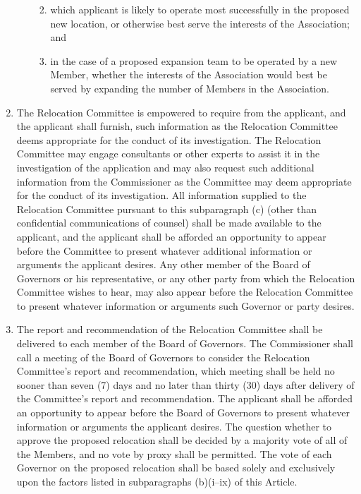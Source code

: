 \documentclass[]{book}
\providecommand{\tightlist}{%
  \setlength{\itemsep}{0pt}\setlength{\parskip}{0pt}}
\begin{document}
\begin{enumerate}
\begin{enumerate}
    \begin{enumerate}
    \def\labelenumiii{(\roman{enumiii})}
    \tightlist
    \item
      which applicant is likely to operate most successfully in the proposed new location, or otherwise best serve the interests of the Association; and
    \item
      in the case of a proposed expansion team to be operated by a new Member, whether the interests of the Association would best be served by expanding the number of Members in the Association.
    \end{enumerate}
  \end{enumerate}
\item
  The Relocation Committee is empowered to require from the applicant, and the applicant shall furnish, such information as the Relocation Committee deems appropriate for the conduct of its investigation. The Relocation Committee may engage consultants or other experts to assist it in the investigation of the application and may also request such additional information from the Commissioner as the Committee may deem appropriate for the conduct of its investigation. All information supplied to the Relocation Committee pursuant to this subparagraph (c) (other than confidential communications of counsel) shall be made available to the applicant, and the applicant shall be afforded an opportunity to appear before the Committee to present whatever additional information or arguments the applicant desires. Any other member of the Board of Governors or his representative, or any other party from which the Relocation Committee wishes to hear, may also appear before the Relocation Committee to present whatever information or arguments such Governor or party desires.
\item
  The report and recommendation of the Relocation Committee shall be delivered to each member of the Board of Governors. The Commissioner shall call a meeting of the Board of Governors to consider the Relocation Committee's report and recommendation, which meeting shall be held no sooner than seven (7) days and no later than thirty (30) days after delivery of the Committee's report and recommendation. The applicant shall be afforded an opportunity to appear before the Board of Governors to present whatever information or arguments the applicant desires. The question whether to approve the proposed relocation shall be decided by a majority vote of all of the Members, and no vote by proxy shall be permitted. The vote of each Governor on the proposed relocation shall be based solely and exclusively upon the factors listed in subparagraphs (b)(i--ix) of this Article.

\end{enumerate}
\end{document}
